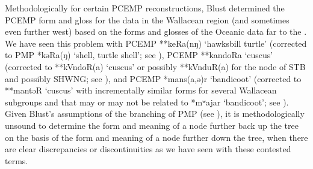 Methodologically for certain PCEMP reconstructions,
Blust determined the PCEMP form
and gloss for the data in the Wallacean region (and sometimes
even further west) based on the forms
and glosses of the Oceanic data far to the .
We have seen this problem with PCEMP **keRa(nŋ) ‘hawksbill turtle’
(corrected to PMP *kəRa(ŋ) ‘shell,
turtle shell’; see ),
PCEMP **kandoRa ‘cuscus’ (corrected to **kVndoR(a) ‘cuscus’ or
possibly **kVnduR(a) for the  node of STB
and possibly SHWNG; see ),
and PCEMP *mans(a,ə)r ‘bandicoot’ (corrected to **mantəR ‘cuscus’
with incrementally similar forms for several Wallacean subgroups
and  that may or may not be related to 
*mʷajar ‘bandicoot’; see ).
Given Blust’s assumptions of the branching of PMP (see ),
it is methodologically unsound to determine the form
and meaning of a node further back up the tree on the basis of
the form and meaning of a node further down the tree,
when there are clear discrepancies or discontinuities as we have
seen with these contested terms.